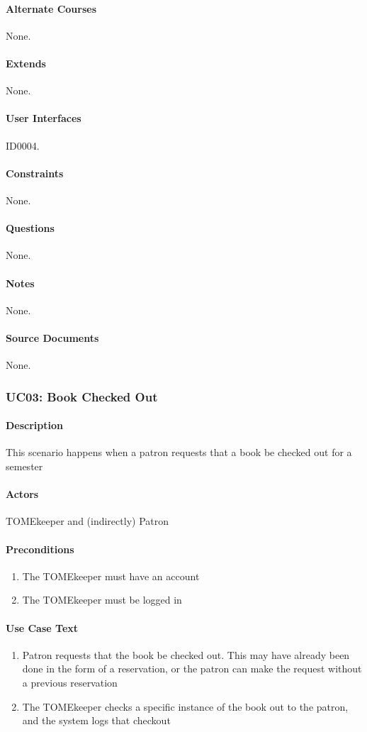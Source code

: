 \documentclass[12pt,titlepage]{article}
\begin{document}
\paragraph{Alternate Courses}
None.
\paragraph{Extends}
None.
\paragraph{User Interfaces}
ID0004.
\paragraph{Constraints}
None.
\paragraph{Questions}
None.
\paragraph{Notes}
None.
\paragraph{Source Documents}
None.

\subsubsection{UC03: Book Checked Out}
\paragraph{Description}
This scenario happens when a patron requests that a book be checked out for a semester
\paragraph{Actors}
TOMEkeeper and (indirectly) Patron
\paragraph{Preconditions}
\begin{enumerate}
	\item The TOMEkeeper must have an account
	\item The TOMEkeeper must be logged in
\end{enumerate}
\paragraph{Use Case Text}
\begin{enumerate}
	\item Patron requests that the book be checked out.  This may have already been done in the form of a reservation, or the patron can make the request without a previous reservation
	\item The TOMEkeeper checks a specific instance of the book out to the patron, and the system logs that checkout
\end{enumerate}
\end{document}
